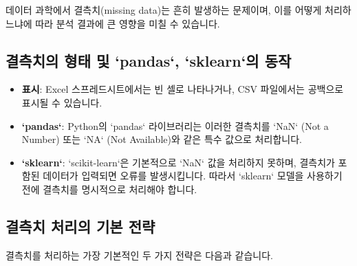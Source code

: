 \documentclass[11pt,a4paper]{article}
\begin{document}
데이터 과학에서 결측치(missing data)는 흔히 발생하는 문제이며, 이를 어떻게 처리하느냐에 따라 분석 결과에 큰 영향을 미칠 수 있습니다.

\subsection*{결측치의 형태 및 `pandas`, `sklearn`의 동작}
\begin{itemize}
    \item \textbf{표시}: Excel 스프레드시트에서는 빈 셀로 나타나거나, CSV 파일에서는 공백으로 표시될 수 있습니다.
    \item \textbf{`pandas`}: Python의 `pandas` 라이브러리는 이러한 결측치를 `NaN` (Not a Number) 또는 `NA` (Not Available)와 같은 특수 값으로 처리합니다.
    \item \textbf{`sklearn`}: `scikit-learn`은 기본적으로 `NaN` 값을 처리하지 못하며, 결측치가 포함된 데이터가 입력되면 오류를 발생시킵니다. 따라서 `sklearn` 모델을 사용하기 전에 결측치를 명시적으로 처리해야 합니다.
\end{itemize}

\subsection*{결측치 처리의 기본 전략}
결측치를 처리하는 가장 기본적인 두 가지 전략은 다음과 같습니다.
\end{document}
